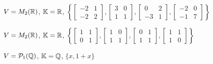 \documentclass[12pt]{exam}
\begin{document}
    \begin{exercicio}
        $V = M_2(\mathbb{R})$, $\mathbb{K} = \mathbb{R}$,
        $
            \left\{
                \begin{bmatrix}
                    -2 & 1\\
                    -2 & 2
                \end{bmatrix},
                \begin{bmatrix}
                    3 & 0\\
                    1 & 1
                \end{bmatrix},
                \begin{bmatrix}
                    0 & 2\\
                    -3 & 1
                \end{bmatrix},
                \begin{bmatrix}
                    -2 & 0\\
                    -1 & 7
                \end{bmatrix}
            \right\}
        $
    \end{exercicio}

    \begin{exercicio}
        $V = M_2(\mathbb{R})$, $\mathbb{K} = \mathbb{R}$,
        $
            \left\{
                \begin{bmatrix}
                    1 & 1\\
                    0 & 1
                \end{bmatrix},
                \begin{bmatrix}
                    1 & 0\\
                    1 & 1
                \end{bmatrix},
                \begin{bmatrix}
                    0 & 1\\
                    1 & 1
                \end{bmatrix},
                \begin{bmatrix}
                    1 & 1\\
                    1 & 0
                \end{bmatrix}
            \right\}
        $
    \end{exercicio}

    \begin{exercicio}
        $V = \mathcal{P}_1(\mathbb{Q})$, $\mathbb{K} = \mathbb{Q}$, $\{x, 1 + x\}$
    \end{exercicio}
\end{document}
